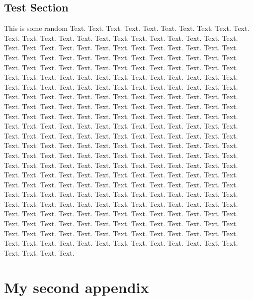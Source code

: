\documentclass{book}
\begin{document}
\section{Test Section}
This is some random Text. Text. Text. Text. Text. Text. Text. Text. Text. Text. Text. Text. Text. Text. Text. Text. Text. Text. Text. Text. Text. Text. Text. Text. Text. Text. Text. Text. Text. Text. Text. Text. Text. Text. Text. Text. Text. Text. Text. Text. Text. Text. Text. Text. Text. Text. Text. Text. Text. Text. Text. Text. Text. Text. Text. Text. Text. Text. Text. Text. Text. Text. Text. Text. Text. Text. Text. Text. Text. Text. Text. Text. Text. Text. Text. Text. Text. Text. Text. Text. Text. Text. Text. Text. Text. Text. Text. Text. Text. Text. Text. Text. Text. Text. Text. Text. Text. Text. Text. Text. Text. Text. Text. Text. Text. Text. Text. Text. Text. Text. Text. Text. Text. Text. Text. Text. Text. Text. Text. Text. Text. Text. Text. Text. Text. Text. Text. Text. Text. Text. Text. Text. Text. Text. Text. Text. Text. Text. Text. Text. Text. Text. Text. Text. Text. Text. Text. Text. Text. Text. Text. Text. Text. Text. Text. Text. Text. Text. Text. Text. Text. Text. Text. Text. Text. Text. Text. Text. Text. Text. Text. Text. Text. Text. Text. Text. Text. Text. Text. Text. Text. Text. Text. Text. Text. Text. Text. Text. Text. Text. Text. Text. Text. Text. Text. Text. Text. Text. Text. Text. Text. Text. Text. Text. Text. Text. Text. Text. Text. Text. Text. Text. Text. Text. Text. Text. Text. Text. Text. Text. Text. Text. Text. Text. Text. Text. Text. Text. Text. Text. Text. Text. Text. Text. Text. Text. Text. Text. Text. Text. Text. Text. Text. Text. Text. Text. Text. Text. Text. Text. Text. Text. Text. Text. Text. Text. Text. Text. Text. Text. Text. Text. Text. Text. Text. Text. Text. Text. Text. Text. Text. Text. Text. Text. Text. Text. Text. Text. Text. Text. Text. Text. Text. Text. Text. Text. Text. Text. Text. Text. Text. Text. Text. Text. Text. Text. Text. Text. Text. Text.

\chapter{My second appendix}
\end{document}
